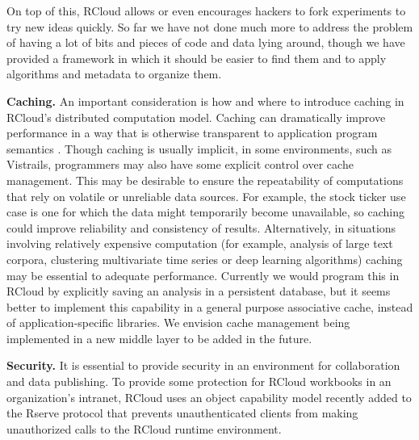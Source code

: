 On top of this, RCloud allows or even encourages hackers to fork experiments
to try new ideas quickly. So far we have not done much more to address the
problem of having a lot of bits and pieces of code and data lying around,
though we have provided a framework in which it should be easier to find them
and to apply algorithms and metadata to organize them.


{\bf Caching.}
An important consideration is how and where to introduce caching
in RCloud's distributed computation model. Caching can dramatically
improve performance in a way that is otherwise transparent to
application program semantics \cite{Callahan:2006:VVM, Guo:2010:TPI}.
Though caching is usually implicit, in some environments, such as
Vistrails, programmers may also have some explicit control over cache
management. This may be desirable to ensure the repeatability of
computations that rely on volatile or unreliable data sources.
For example, the stock ticker use case is one for which the data
might temporarily become unavailable, so caching could improve
reliability and consistency of results. Alternatively, in situations
involving relatively expensive computation (for example, analysis of large
text corpora, clustering multivariate time series or deep learning algorithms)
caching may be essential to adequate performance. Currently we would
program this in RCloud by explicitly saving an analysis in a persistent database,
but it seems better to implement this capability in a general purpose associative
cache, instead of application-specific libraries. We envision cache management
being implemented in a new middle layer to be added in the future.

{\bf Security.}
It is essential to provide security in an environment for
collaboration and data publishing. To provide some
protection for RCloud workbooks in an organization's intranet,
RCloud uses an object capability model
\cite{Miller:2006:RCT}
recently added to the Rserve protocol \cite{Urbanek:2003:AFW}
that prevents unauthenticated clients from making
unauthorized calls to the RCloud runtime environment.

